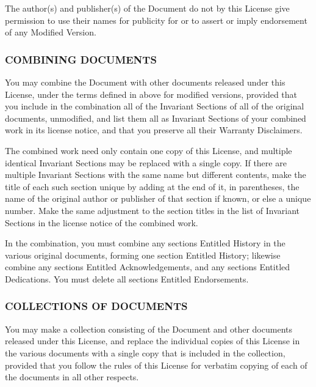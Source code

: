 \documentclass[10pt,english]{article}
\begin{document}
The author(s) and publisher(s) of the Document do not by this License
give permission to use their names for publicity for or to assert
or imply endorsement of any Modified Version.


\subsubsection{COMBINING DOCUMENTS}

You may combine the Document with other documents released under this
License, under the terms defined in  above
for modified versions, provided that you include in the combination
all of the Invariant Sections of all of the original documents, unmodified,
and list them all as Invariant Sections of your combined work in its
license notice, and that you preserve all their Warranty Disclaimers.

The combined work need only contain one copy of this License, and
multiple identical Invariant Sections may be replaced with a single
copy. If there are multiple Invariant Sections with the same name
but different contents, make the title of each such section unique
by adding at the end of it, in parentheses, the name of the original
author or publisher of that section if known, or else a unique number.
Make the same adjustment to the section titles in the list of Invariant
Sections in the license notice of the combined work.

In the combination, you must combine any sections Entitled \textquotedbl{}History\textquotedbl{}
in the various original documents, forming one section Entitled \textquotedbl{}History\textquotedbl{};
likewise combine any sections Entitled \textquotedbl{}Acknowledgements\textquotedbl{},
and any sections Entitled \textquotedbl{}Dedications\textquotedbl{}.
You must delete all sections Entitled \textquotedbl{}Endorsements\textquotedbl{}.


\subsubsection{COLLECTIONS OF DOCUMENTS}

You may make a collection consisting of the Document and other documents
released under this License, and replace the individual copies of
this License in the various documents with a single copy that is included
in the collection, provided that you follow the rules of this License
for verbatim copying of each of the documents in all other respects.
\end{document}
